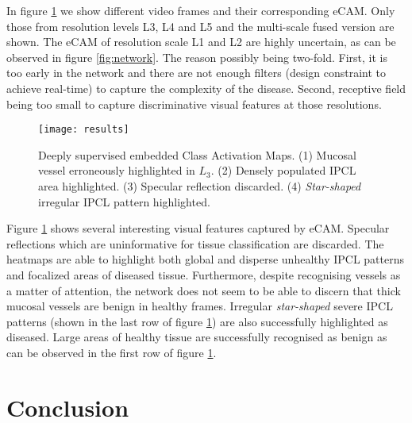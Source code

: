 \documentclass[runningheads]{llncs}
\begin{document}
In figure \ref{fig:results} we show different video frames and their corresponding eCAM. Only those from resolution levels L3, L4 and L5 and the multi-scale fused version are shown. The eCAM of resolution scale L1 and L2 are highly uncertain, as can be observed in figure \ref{fig:network}. The reason possibly being two-fold. First, it is too early in the network and there are not enough filters (design constraint to achieve real-time) to capture the complexity of the disease. Second, receptive field being too small to capture discriminative visual features at those resolutions. 

\begin{figure}[t!]
	\centering
	\texttt{[image: results]}
	\caption{Deeply supervised embedded Class Activation Maps. (1) Mucosal vessel erroneously highlighted in $L_3$. (2) Densely populated IPCL area highlighted. (3) Specular reflection discarded. (4) \textit{Star-shaped} irregular IPCL pattern highlighted.}
	\label{fig:results}
\end{figure}

Figure \ref{fig:results} shows several interesting visual features captured by eCAM. Specular reflections which are uninformative for tissue classification are discarded. The heatmaps are able to highlight both global and disperse unhealthy IPCL patterns and focalized areas of diseased tissue.  Furthermore, despite recognising vessels as a matter of attention, the network does not seem to be able to discern that thick mucosal vessels are benign in healthy frames. Irregular \textit{star-shaped} severe IPCL patterns (shown in the last row of figure \ref{fig:results}) are also successfully highlighted as diseased. Large areas of healthy tissue are successfully recognised as benign as can be observed in the first row of figure \ref{fig:results}.

%

\section{Conclusion}
\end{document}
